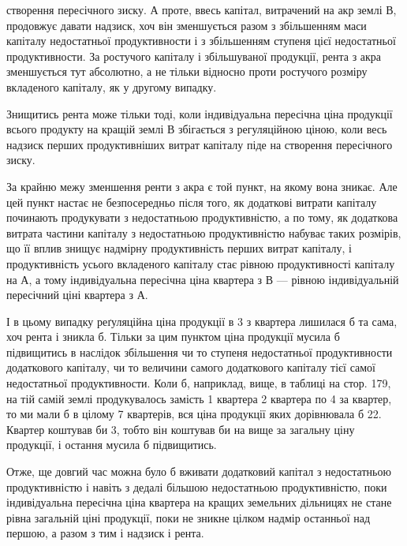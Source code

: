 \parcont{}  %
створення пересічного зиску. А проте, ввесь капітал, витрачений на акр землі В,
продовжує давати надзиск, хоч він зменшується разом з збільшенням маси капіталу
недостатньої продуктивности і з збільшенням ступеня цієї недостатньої
продуктивности. За ростучого капіталу і збільшуваної продукції, рента з акра
зменшується тут абсолютно, а не тільки відносно проти ростучого розміру вкладеного
капіталу, як у другому випадку.

Знищитись рента може тільки тоді, коли індивідуальна пересічна ціна
продукції всього продукту на кращій землі В збігається з регуляційною ціною,
коли весь надзиск перших продуктивніших витрат капіталу піде на створення
пересічного зиску.

За крайню межу зменшення ренти з акра є той пункт, на якому вона
зникає. Але цей пункт настає не безпосередньо після того, як додаткові витрати
капіталу починають продукувати з недостатньою продуктивністю, а по тому, як
додаткова витрата частини капіталу з недостатньою продуктивністю набуває таких
розмірів, що її вплив знищує надмірну продуктивність перших витрат капіталу,
і продуктивність усього вкладеного капіталу стає рівною продуктивності капіталу
на А, а тому індивідуальна пересічна ціна квартера з В — рівною індивідуальній
пересічний ціні квартера з А.

І в цьому випадку реґуляційна ціна продукції в 3 з квартера
лишилася б та сама, хоч рента і зникла б. Тільки за цим пунктом ціна продукції
мусила б підвищитись в наслідок збільшення чи то ступеня недостатньої
продуктивности додаткового капіталу, чи то величини самого додаткового
капіталу тієї самої недостатньої продуктивности. Коли б, наприклад, вище, в таблиці
на стор. 179, на тій самій землі продукувалось замість 1 квартера 2 квартера
по 4 за квартер, то ми мали б в цілому 7 квартерів, вся ціна
продукції яких дорівнювала б 22. Квартер коштував би 3,
тобто він коштував би на  вище за загальну ціну продукції, і остання
мусила б підвищитись.

Отже, ще довгий час можна було б вживати додатковий капітал з недостатньою
продуктивністю і навіть з дедалі більшою недостатньою продуктивністю,
поки індивідуальна пересічна ціна квартера на кращих земельних дільницях
не стане рівна загальній ціні продукції, поки не зникне цілком надмір останньої
над першою, а разом з тим і надзиск і рента.

